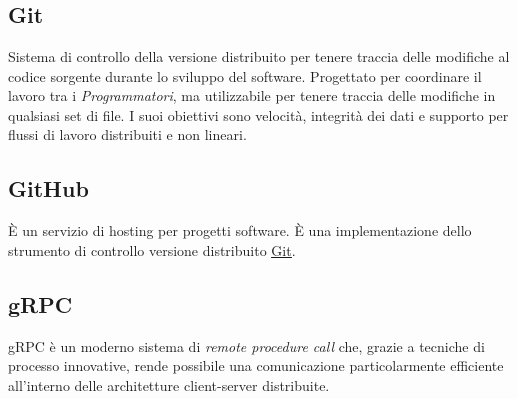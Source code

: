 \section{}
\subsection*{Git}
\label{sec:Git}
Sistema di controllo della versione distribuito per tenere traccia delle modifiche al codice sorgente durante lo sviluppo del software. Progettato per coordinare il lavoro tra i \textit{Programmatori}, ma utilizzabile per tenere traccia delle modifiche in qualsiasi set di file. I suoi obiettivi sono velocità, integrità dei dati e supporto per flussi di lavoro distribuiti e non lineari.
\subsection*{GitHub}
\label{sec:GitHub}
È un servizio di hosting per progetti software. È una implementazione dello strumento di controllo versione distribuito \hyperref[sec:Git]{\underline{Git}}.
\subsection*{gRPC} gRPC è un moderno sistema di \textit{remote procedure call} che, grazie a tecniche di processo innovative, rende possibile una comunicazione particolarmente efficiente all’interno delle architetture client-server distribuite.
